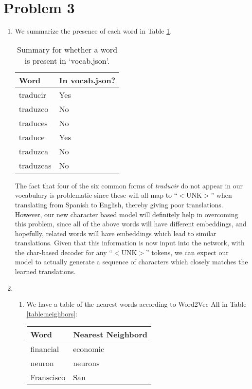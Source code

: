 \documentclass[12pt]{article}
\begin{document}
\section*{Problem 3}
\begin{enumerate}[label=(\alph*)]
  \item We summarize the presence of each word in Table \ref{table:vocab}.
  \begin{table}[!ht]
    \centering
    \begin{tabular}{|l|l|}
    Word      & In vocab.json? \\ \hline
    traducir  & Yes            \\
    traduzco  & No             \\
    traduces  & No             \\
    traduce   & Yes            \\
    traduzca  & No             \\
    traduzcas & No            
    \end{tabular}
    \caption{Summary for whether a word is present in `vocab.json'.}
    \label{table:vocab}
  \end{table}
  The fact that four of the six common forms of \textit{traducir} do not appear in our vocabulary is problematic since these will all map to ``$<$UNK$>$'' when translating from Spanish to English, thereby giving poor translations. However, our new character based model will definitely help in overcoming this problem, since all of the above words will have different embeddings, and hopefully, related words will have embeddings which lead to similar translations. Given that this information is now input into the network, with the char-based decoder for any ``$<$UNK$>$'' tokens, we can expect our model to actually generate a sequence of characters which closely matches the learned translations.
  \item 
    \begin{enumerate}[label=(\roman*)]
      \item We have a table of the nearest words according to Word2Vec All in Table \ref{table:neighbors}:
      \begin{table}[!ht]
        \centering
        \begin{tabular}{|l|l|}
        Word      & Nearest Neighbord \\ \hline
        financial  & economic               \\
        neuron  & neurons              \\
        Franscisco  & San             \\

\end{tabular}
\end{table}
\end{enumerate}
\end{enumerate}
\end{document}
